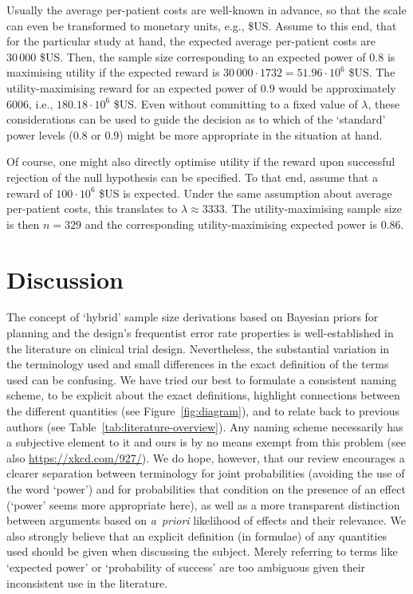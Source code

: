 \documentclass{article}
\begin{document}
Usually the average per-patient costs are well-known in advance, so that the scale can even be transformed to monetary units, e.g., \$US.
Assume to this end, that for the particular study at hand, the expected average per-patient costs are $30\,000$ \$US.
Then, the sample size corresponding to an expected power of $0.8$ is maximising utility if the expected reward is $30\,000\cdot1732=51.96\cdot 10^6$ \$US.
The utility-maximising reward for an expected power of $0.9$ would be approximately $6006$, i.e., $180.18\cdot 10^6$ \$US.
Even without committing to a fixed value of $\lambda$, these considerations can be used to guide the decision as to which of the `standard' power levels (0.8 or 0.9) might be more appropriate in the situation at hand.

Of course, one might also directly optimise utility if the reward upon successful rejection of the null hypothesis can be specified.
To that end, assume that a reward of $100\cdot 10^6$ \$US is expected.
Under the same assumption about average per-patient costs, this translates to $\lambda\approx3333$.
The utility-maximising sample size is then $n=329$ and the corresponding utility-maximising expected power is $0.86$.



\section{Discussion}

The concept of `hybrid' sample size derivations based on
Bayesian priors for planning and the design's frequentist error rate properties is well-established in the literature on clinical trial design.
Nevertheless, the substantial variation in the terminology used and small differences in the exact definition of the terms used can be confusing.
We have tried our best to formulate a consistent naming scheme,
to be explicit about the exact definitions,
highlight connections between the different quantities
(see Figure~\ref{fig:diagram}),
and to relate back to previous authors (see Table~\ref{tab:literature-overview}).
Any naming scheme necessarily has a subjective element to it
and ours is by no means exempt from this problem (see also \url{https://xkcd.com/927/}).
We do hope, however, that our review encourages a clearer separation
between terminology for joint probabilities (avoiding the use of the word `power') and for probabilities that condition on the presence of an effect (`power' seems more appropriate here), as well as a more transparent distinction between arguments based on \textit{a~priori} likelihood of effects and their relevance.
We also strongly believe that an explicit definition (in formulae)
of any quantities used should be given when discussing
the subject.
Merely referring to terms like `expected power' or
`probability of success' are too ambiguous given their inconsistent use in the literature.
\end{document}
